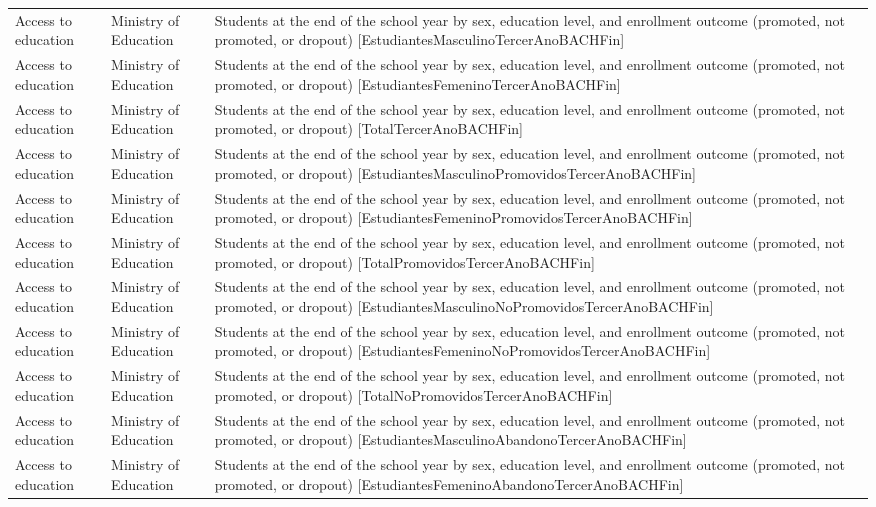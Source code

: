 \documentclass[10pt,a4paper]{article}
\begin{document}
\begin{longtable}{@{}>{\raggedright\arraybackslash}p{3.5cm}>{\raggedright\arraybackslash}p{5.6cm}>{\raggedright\arraybackslash}p{\dimexpr\textwidth-9.1cm-4\tabcolsep\relax}@{}}
Access to education & Ministry of Education & Students at the end of the school year by sex, education level, and enrollment outcome (promoted, not promoted, or dropout) [EstudiantesMasculinoTercerAnoBACHFin]\\
Access to education & Ministry of Education & Students at the end of the school year by sex, education level, and enrollment outcome (promoted, not promoted, or dropout) [EstudiantesFemeninoTercerAnoBACHFin]\\
Access to education & Ministry of Education & Students at the end of the school year by sex, education level, and enrollment outcome (promoted, not promoted, or dropout) [TotalTercerAnoBACHFin]\\
Access to education & Ministry of Education & Students at the end of the school year by sex, education level, and enrollment outcome (promoted, not promoted, or dropout) [EstudiantesMasculinoPromovidosTercerAnoBACHFin]\\
Access to education & Ministry of Education & Students at the end of the school year by sex, education level, and enrollment outcome (promoted, not promoted, or dropout) [EstudiantesFemeninoPromovidosTercerAnoBACHFin]\\
Access to education & Ministry of Education & Students at the end of the school year by sex, education level, and enrollment outcome (promoted, not promoted, or dropout) [TotalPromovidosTercerAnoBACHFin]\\
Access to education & Ministry of Education & Students at the end of the school year by sex, education level, and enrollment outcome (promoted, not promoted, or dropout) [EstudiantesMasculinoNoPromovidosTercerAnoBACHFin]\\
Access to education & Ministry of Education & Students at the end of the school year by sex, education level, and enrollment outcome (promoted, not promoted, or dropout) [EstudiantesFemeninoNoPromovidosTercerAnoBACHFin]\\
Access to education & Ministry of Education & Students at the end of the school year by sex, education level, and enrollment outcome (promoted, not promoted, or dropout) [TotalNoPromovidosTercerAnoBACHFin]\\
Access to education & Ministry of Education & Students at the end of the school year by sex, education level, and enrollment outcome (promoted, not promoted, or dropout) [EstudiantesMasculinoAbandonoTercerAnoBACHFin]\\
Access to education & Ministry of Education & Students at the end of the school year by sex, education level, and enrollment outcome (promoted, not promoted, or dropout) [EstudiantesFemeninoAbandonoTercerAnoBACHFin]\\

\end{longtable}
\end{document}

